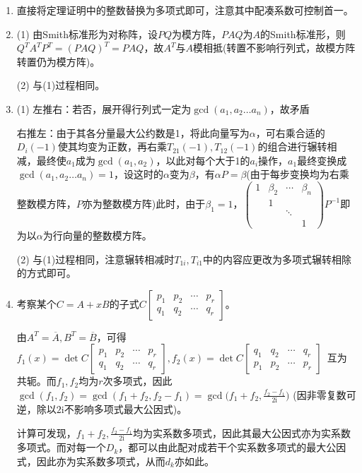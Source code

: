 \documentclass[a4paper,UTF8,fontset=windows]{ctexart}
\begin{document}
\begin{enumerate}
\item
直接将定理证明中的整数替换为多项式即可，注意其中配凑系数可控制首一。

\item
(1) 由Smith标准形为对称阵，设$PQ$为模方阵，$PAQ$为$A$的Smith标准形，则$Q^TA^TP^T=(PAQ)^T=PAQ$，故$A^T$与$A$模相抵(转置不影响行列式，故模方阵转置仍为模方阵)。

(2) 与(1)过程相同。

\item
(1) 左推右：若否，展开得行列式一定为$\gcd(a_1,a_2\dots a_n)$，故矛盾

右推左：由于其各分量最大公约数是1，将此向量写为$\alpha$，可右乘合适的$D_i(-1)$使其均变为正数，再右乘$T_{21}(-1),T_{12}(-1)$的组合进行辗转相减，最终使$a_1$成为$\gcd(a_1,a_2)$，以此对每个大于1的$a_i$操作，$a_1$最终变换成$\gcd(a_1,a_2\dots a_n)=1$，设这时的$\alpha$变为$\beta$，有$\alpha P=\beta$(由于每步变换均为右乘整数模方阵，$P$亦为整数模方阵)此时，由于$\beta_1=1$，$\begin{pmatrix}1&\beta_2&\cdots&\beta_n\\&1&&\\&&\ddots&\\&&&1\end{pmatrix}P^{-1}$即为以$\alpha$为行向量的整数模方阵。

(2) 与(1)过程相同，注意辗转相减时$T_{1i},T_{i1}$中的内容应更改为多项式辗转相除的方式即可。

\item
考察某个$C=A+xB$的子式$C\begin{bmatrix}p_1&p_2&\cdots&p_r\\q_1&q_2&\cdots&q_r\end{bmatrix}$。

由$A^T=\overline{A},B^T=\overline{B}$，可得$f_1(x)=\det{C\begin{bmatrix}p_1&p_2&\cdots&p_r\\q_1&q_2&\cdots&q_r\end{bmatrix}},f_2(x)=\det{C\begin{bmatrix}q_1&q_2&\cdots&q_r\\p_1&p_2&\cdots&p_r\end{bmatrix}}$\ 互为共轭。而$f_1,f_2$均为$r$次多项式，因此$\gcd(f_1,f_2)=\gcd(f_1+f_2,f_2-f_1)=\gcd\big(f_1+f_2,\frac{f_2-f_1}{2\mathrm{i}}\big)$ (因非零复数可逆，除以$2\mathrm{i}$不影响多项式最大公因式)。

计算可发现，$f_1+f_2,\frac{f_2-f_1}{2\mathrm{i}}$均为实系数多项式，因此其最大公因式亦为实系数多项式。而对每一个$D_k$，都可以由此配对成若干个实系数多项式的最大公因式，因此亦为实系数多项式，从而$d_k$亦如此。


\end{enumerate}
\end{document}
